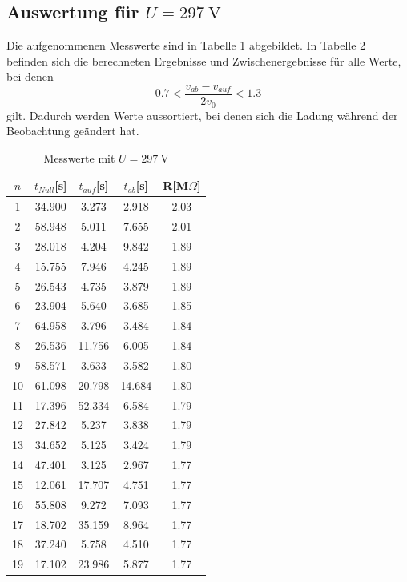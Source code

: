 \documentclass[11pt,ngerman,a4paper]{article}
\begin{document}
\subsection{Auswertung für $U=\SI{297}{\volt}$}
Die aufgenommenen Messwerte sind in Tabelle 1 abgebildet. In Tabelle 2 befinden sich die berechneten Ergebnisse und Zwischenergebnisse für alle Werte, bei denen
\begin{equation}
0.7 < \frac{v_{ab}-v_{auf}}{2 v_0} < 1.3
\end{equation}
gilt. Dadurch werden Werte aussortiert, bei denen sich die Ladung während der Beobachtung geändert hat.
\begin{table}[H]
\centering
\begin{tabular}{ccccc}
\toprule
$n$ &{$t_{Null}$[s]} &{ $t_{auf}$[s]} &{ $t_{ab}$[s]} &{ R[M$\Omega$] }\\
\midrule
1 &34.900 & 3.273 & 2.918 & 2.03\\
2 &58.948 & 5.011 & 7.655 & 2.01\\
3 &28.018 & 4.204 & 9.842 & 1.89\\
4 &15.755 & 7.946 & 4.245 & 1.89\\
5 &26.543 & 4.735 & 3.879 & 1.89\\
6 &23.904 & 5.640 & 3.685 & 1.85\\
7 &64.958 & 3.796 & 3.484 & 1.84\\
8 &26.536 & 11.756 & 6.005 & 1.84\\
9 &58.571 & 3.633 & 3.582 & 1.80\\
10 &61.098 & 20.798 & 14.684 & 1.80\\
11 &17.396 & 52.334 & 6.584 & 1.79\\
12 &27.842 & 5.237 & 3.838 & 1.79\\
13 &34.652 & 5.125 & 3.424 & 1.79\\
14 &47.401 & 3.125 & 2.967 & 1.77\\
15 &12.061 & 17.707 & 4.751 & 1.77\\
16 &55.808 & 9.272 & 7.093 & 1.77\\
17 &18.702 & 35.159 & 8.964 & 1.77\\
18 &37.240 & 5.758 & 4.510 & 1.77\\
19 &17.102 & 23.986 & 5.877 & 1.77\\
\bottomrule
\end{tabular}
\label{}
\caption{Messwerte mit $U=\SI{297}{\volt}$}
\end{table}
\end{document}
